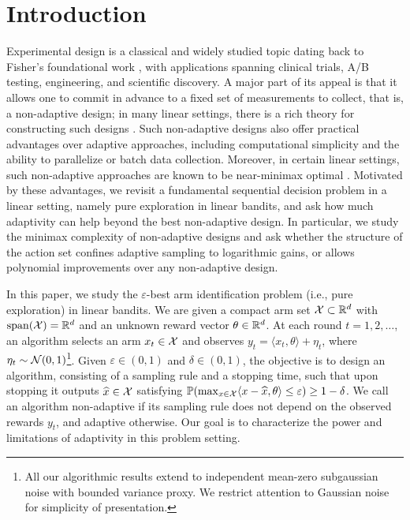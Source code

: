 \section{Introduction}
Experimental design is a classical and widely studied topic dating back to Fisher’s foundational work \citep{fisher1935design}, with applications spanning clinical trials, A/B testing, engineering, and scientific discovery. A major part of its appeal is that it allows one to commit in advance to a fixed set of measurements to collect, that is, a non-adaptive design; in many linear settings, there is a rich theory for constructing such designs \citep{pukelsheim2006optimal}.  Such non-adaptive designs also offer practical advantages over adaptive approaches, including computational simplicity and the ability to parallelize or batch data collection. Moreover, in certain linear settings, such non-adaptive approaches are known to be near-minimax optimal \citep{arias2012fundamental,even2002pac,fan2025universal}. Motivated by these advantages, we revisit a fundamental sequential decision problem in a linear setting, namely {pure exploration in} linear bandits, and ask how much adaptivity can help beyond the best non-adaptive design. In particular, we study the minimax complexity of non-adaptive designs and ask whether the structure of the action set confines adaptive sampling to logarithmic gains, or allows polynomial improvements over any non-adaptive design.



In this paper, we study the $\varepsilon$-best arm identification  problem {(i.e., pure exploration)} in linear bandits. We are given a compact arm set $\mathcal{X}\subset \mathbb{R}^d$ with $\mathrm{span}(\mathcal{X})=\mathbb{R}^d$ and an unknown reward vector $\theta\in\mathbb{R}^d$. At each round $t=1,2,\dots$, an algorithm selects an arm $x_t\in\mathcal{X}$ and observes $y_t=\langle x_t,\theta\rangle+\eta_t$, where $\eta_t\sim\mathcal{N}(0,1)$\footnote{All our algorithmic results extend to independent mean-zero subgaussian noise with bounded variance proxy. We restrict attention to Gaussian noise for simplicity of presentation.}.
 Given $\varepsilon\in(0,1)$ and $\delta\in(0,1)$, the objective is to design an algorithm, consisting of a sampling rule and a stopping time, such that upon stopping it outputs $\widehat{x}\in\mathcal{X}$ satisfying $\mathbb{P}\!\left(\max_{x\in\mathcal{X}}\langle x-\widehat{x},\theta\rangle\le \varepsilon\right)\ge 1-\delta$. We call an algorithm non-adaptive if its sampling rule does not depend on the observed rewards $y_t$, and adaptive otherwise. Our goal is to characterize the power and limitations of adaptivity in this problem setting.

